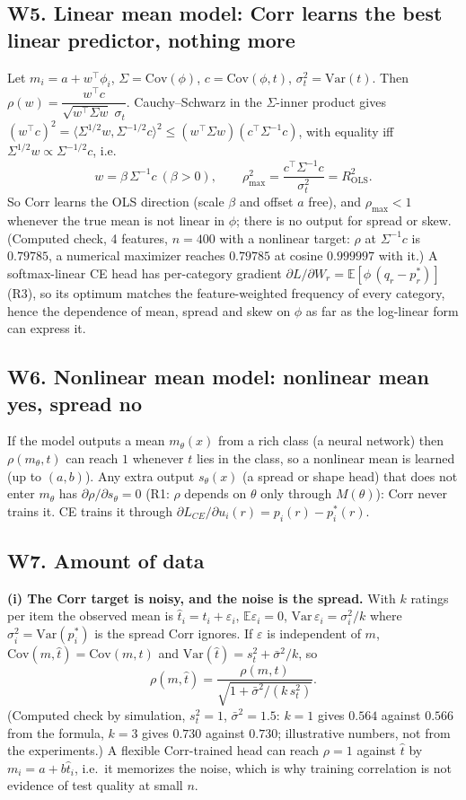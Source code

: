\documentclass[11pt]{article}
\begin{document}
\subsection*{W5. Linear mean model: Corr learns the best linear predictor, nothing more}
Let $m_i=a+w^\top\phi_i$, $\Sigma=\mathrm{Cov}(\phi)$, $c=\mathrm{Cov}(\phi,t)$, $\sigma_t^2=\mathrm{Var}(t)$. Then $\rho(w)=\dfrac{w^\top c}{\sqrt{w^\top\Sigma w}\;\sigma_t}$. Cauchy--Schwarz in the $\Sigma$-inner product gives $(w^\top c)^2=\langle\Sigma^{1/2}w,\Sigma^{-1/2}c\rangle^2\le (w^\top\Sigma w)(c^\top\Sigma^{-1}c)$, with equality iff $\Sigma^{1/2}w\propto\Sigma^{-1/2}c$, i.e.
\[
w=\beta\,\Sigma^{-1}c\ (\beta>0),\qquad \rho_{\max}^2=\frac{c^\top\Sigma^{-1}c}{\sigma_t^2}=R^2_{\mathrm{OLS}} .
\]
So Corr learns the OLS direction (scale $\beta$ and offset $a$ free), and $\rho_{\max}<1$ whenever the true mean is not linear in $\phi$; there is no output for spread or skew. (Computed check, 4 features, $n=400$ with a nonlinear target: $\rho$ at $\Sigma^{-1}c$ is $0.79785$, a numerical maximizer reaches $0.79785$ at cosine $0.999997$ with it.) A softmax-linear CE head has per-category gradient $\partial L/\partial W_r=\mathbb E[\phi\,(q_r-p^\ast_r)]$ (R3), so its optimum matches the feature-weighted frequency of every category, hence the dependence of mean, spread and skew on $\phi$ as far as the log-linear form can express it.

\subsection*{W6. Nonlinear mean model: nonlinear mean yes, spread no}
If the model outputs a mean $m_\theta(x)$ from a rich class (a neural network) then $\rho(m_\theta,t)$ can reach $1$ whenever $t$ lies in the class, so a nonlinear mean is learned (up to $(a,b)$). Any extra output $s_\theta(x)$ (a spread or shape head) that does not enter $m_\theta$ has $\partial\rho/\partial s_\theta=0$ (R1: $\rho$ depends on $\theta$ only through $M(\theta)$): Corr never trains it. CE trains it through $\partial L_{CE}/\partial u_i(r)=p_i(r)-p^\ast_i(r)$.

\subsection*{W7. Amount of data}
\textbf{(i) The Corr target is noisy, and the noise is the spread.} With $k$ ratings per item the observed mean is $\hat t_i=t_i+\varepsilon_i$, $\mathbb E\varepsilon_i=0$, $\mathrm{Var}\,\varepsilon_i=\sigma_i^2/k$ where $\sigma_i^2=\mathrm{Var}(p^\ast_i)$ is the spread Corr ignores. If $\varepsilon$ is independent of $m$, $\mathrm{Cov}(m,\hat t)=\mathrm{Cov}(m,t)$ and $\mathrm{Var}(\hat t)=s_t^2+\bar\sigma^2/k$, so
\[
\rho(m,\hat t)=\frac{\rho(m,t)}{\sqrt{1+\bar\sigma^2/(k\,s_t^2)}}.
\]
(Computed check by simulation, $s_t^2=1$, $\bar\sigma^2=1.5$: $k=1$ gives $0.564$ against $0.566$ from the formula, $k=3$ gives $0.730$ against $0.730$; illustrative numbers, not from the experiments.) A flexible Corr-trained head can reach $\rho=1$ against $\hat t$ by $m_i=a+b\hat t_i$, i.e.\ it memorizes the noise, which is why training correlation is not evidence of test quality at small $n$.
\end{document}
